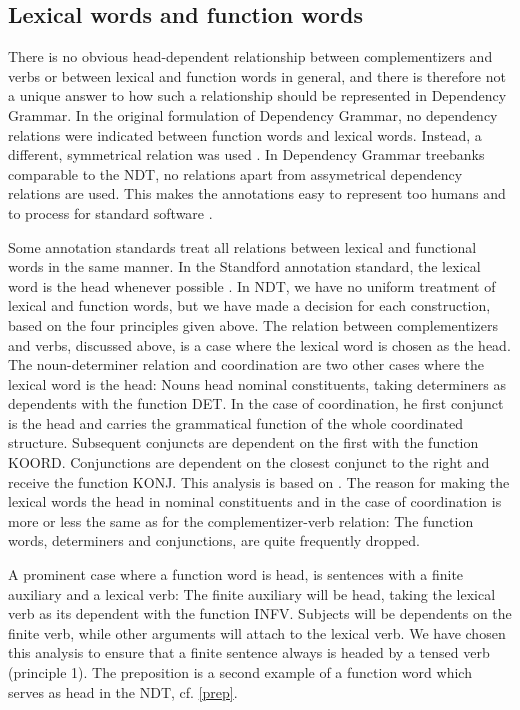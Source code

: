 \documentclass[10pt,a4paper]{article}
\begin{document}
\subsection{Lexical words and function words}
There is no obvious head-dependent relationship between complementizers and verbs or between lexical and function words in general, and there is therefore not a unique answer to how such a relationship should be represented in Dependency Grammar.
In the original formulation of Dependency Grammar, no dependency relations were indicated between function words and lexical words. Instead, a different, symmetrical relation was used \cite[361-410]{Tes:65}. 
In Dependency Grammar treebanks comparable to the NDT, no relations apart from assymetrical dependency relations are used.
This makes the annotations easy to represent too humans and to process for standard software \cite[4]{Mar:Man:08}.

Some annotation standards treat all relations between lexical and functional words in the same manner. In the Standford annotation standard, the lexical word is the head whenever possible \cite[2]{Mar:Man:08}.
In NDT, we have no uniform treatment of lexical and function words, but we have made a decision for each construction, based on the four principles given above. 
The relation between complementizers and verbs, discussed above, is a case where the lexical word is chosen as the head. The noun-determiner relation and coordination are
two other cases where the lexical word is the head: Nouns head nominal constituents, taking determiners as dependents with the function DET. In the case of coordination, he first conjunct is the head and carries the grammatical function of the whole coordinated structure. Subsequent conjuncts are dependent on the first with the function KOORD.
Conjunctions are dependent on the closest conjunct to the right and receive the function KONJ. This analysis is based on \cite{Niv:Nil:Hal:2006}.
The reason for making the lexical words the head in nominal constituents and in the case of coordination is more or less the same as for the complementizer-verb relation:
The function words, determiners and conjunctions, are quite frequently dropped.

A prominent case where a function word is head, is sentences with a finite auxiliary and a lexical verb: The finite auxiliary will be head, taking the lexical verb as its dependent with the function INFV. Subjects will be dependents on the finite verb, while other arguments will attach to the lexical verb. We have chosen this analysis to ensure that a finite sentence always is headed by a tensed verb (principle 1). The preposition is a second example of a function word which serves as head in the NDT, cf. \ref{prep}.
\end{document}
